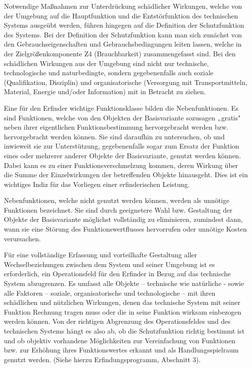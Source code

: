 \documentclass[12pt,a4paper]{article}
\begin{document}
Notwendige Maßnahmen zur Unterdrückung schädlicher Wirkungen, welche von der
Umgebung auf die Hauptfunktion und die Entstörfunktion des technischen Systems
ausgeübt werden, führen hingegen auf die Definition der Schutzfunktion des
Systems. Bei der Definition der Schutzfunktion kann man sich zunächst von den
Gebrauchseigenschaften und Gebrauchsbedingungen leiten lassen, welche in der
Zielgrößenkomponente Z4 (Brauchbarkeit) zusammengefasst sind. Bei den
schädlichen Wirkungen aus der Umgebung sind nicht nur technische,
technologische und naturbedingte, sondern gegebenenfalls auch soziale
(Qualifikation, Disziplin) und organisatorische (Versorgung mit
Transportmitteln, Material, Energie und/oder Information) mit in Betracht zu
ziehen.

Eine für den Erfinder wichtige Funktionsklasse bilden die Nebenfunktionen. Es
sind Funktionen, welche von den Objekten der Basisvariante sozusagen „gratis"
neben ihrer eigentlichen Funktionsbestimmung hervorgebracht werden
bzw. hervorgebracht werden können. Sie sind daraufhin zu untersuchen, ob und
inwieweit sie zur Unterstützung, gegebenenfalls sogar zum Ersatz der Funktion
eines oder mehrerer anderer Objekte der Basisvariante, genutzt werden
können. Dabei kann es zu einer Funktionsverschmelzung kommen, deren Wirkung
über die Summe der Einzelwirkungen der betreffenden Objekte hinausgeht. Dies
ist ein wichtiges Indiz für das Vorliegen einer erfinderischen Leistung.

Nebenfunktionen, welche nicht genutzt werden können, werden als unnötige
Funktionen bezeichnet. Sie sind durch geeignetere Wahl bzw. Gestaltung der
Objekte der Basisvariante möglichst vollständig zu eliminieren, zumindest
dann, wann sie eine Störung des Funktionswertflusses hervorrufen oder unnötige
Kosten verursachen.

Für eine vollständige Erfassung und vorteilhafte Gestaltung aller
Wechselbeziehungen zwischen dem System und seiner Umgebung ist es
erforderlich, ein Operationsfeld für den Erfinder in Bezug auf das technische
System abzugrenzen. Es umfasst alle Objekte -- technische wie natürliche -
sowie alle Faktoren -- soziale, organisatorische und technologische -- mit ihren
schädlichen und nützlichen Wirkungen, denen das technische System mit seiner
Funktion Rechnung tragen muss oder die in seine Funktion wirksam einbezogen
werden können. Von der richtigen Abgrenzung des Operationsfeldes und des
technischen Systems hängt es also ab, ob die Schutzfunktion richtig bestimmt
ist und ob objektiv vorhandene Möglichkeiten zur Vereinfachung von Funktionen
bzw. zur Erhöhung ihres Funktionswertes erkannt und als Handlungsspielraum
genutzt werden. (Siehe hierzu Erfindungsprogramm, Abschnitt 3).
\end{document}
